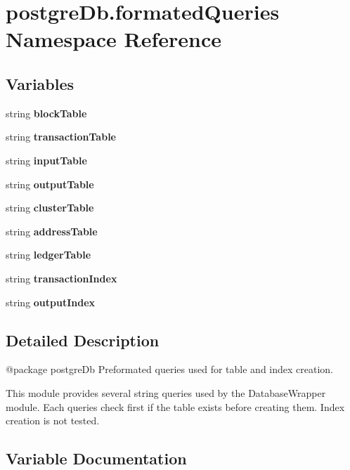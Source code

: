 \hypertarget{namespacepostgreDb_1_1formatedQueries}{}\section{postgre\+Db.\+formated\+Queries Namespace Reference}
\label{namespacepostgreDb_1_1formatedQueries}
\subsection*{Variables}
\begin{DoxyCompactItemize}
\item 
string {\bfseries block\+Table}
\item 
string {\bfseries transaction\+Table}
\item 
string {\bfseries input\+Table}
\item 
string {\bfseries output\+Table}
\item 
string {\bfseries cluster\+Table}
\item 
string {\bfseries address\+Table}
\item 
string {\bfseries ledger\+Table}
\item 
string {\bfseries transaction\+Index}
\item 
string {\bfseries output\+Index}
\end{DoxyCompactItemize}


\subsection{Detailed Description}
\begin{DoxyVerb}@package postgreDb
Preformated queries used for table and index creation.

This module provides several string queries used by the DatabaseWrapper module.
Each queries check first if the table exists before creating them.
Index creation is not tested.
\end{DoxyVerb}
 

\subsection{Variable Documentation}
\hypertarget{namespacepostgreDb_1_1formatedQueries_a404bfcbf555fbc51bdb53a3cb9fb5b26}{}
